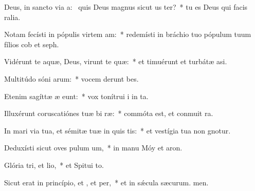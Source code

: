 \item Deus, in sancto via a:~\pscross{} quis Deus magnus sicut us ter?~* tu es Deus qui facis ralia.
\item Notam fecísti in pópulis virtem am:~* redemísti in bráchio tuo pópulum tuum fílios cob et seph.
\item Vidérunt te aquæ, Deus, virunt te quæ:~* et timuérunt et turbátæ  asi.
\item Multitúdo sóni arum:~* vocem derunt bes.
\item Etenim sagíttæ æ eunt:~* vox tonítrui i in ta.
\item Illuxérunt coruscatiónes tuæ bi ræ:~* commóta est, et conmuit ra.
\item In mari via tua, et sémitæ tuæ in quis tis:~* et vestígia tua non gnotur.
\item Deduxísti sicut oves pulum um,~* in manu Móy et aron.
\item Glória tri, et lio,~* et Spitui to.
\item Sicut erat in princípio, et , et per,~* et in sǽcula sæcurum. men.
